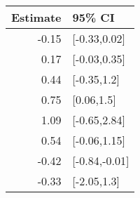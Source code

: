 \begin{tabular}{rl}
  \hline
Estimate & 95\% CI \\ 
  \hline
-0.15 & [-0.33,0.02] \\ 
  0.17 & [-0.03,0.35] \\ 
  0.44 & [-0.35,1.2] \\ 
  0.75 & [0.06,1.5] \\ 
  1.09 & [-0.65,2.84] \\ 
  0.54 & [-0.06,1.15] \\ 
  -0.42 & [-0.84,-0.01] \\ 
  -0.33 & [-2.05,1.3] \\ 
   \hline
\end{tabular}

